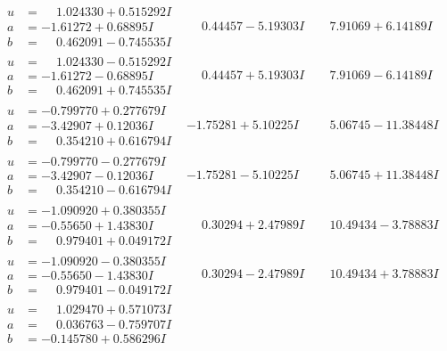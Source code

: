 \documentclass[1p]{elsarticle_modified}
\theoremstyle{definition}
\begin{document}
$$\begin{array}{c|c|c}
\begin{aligned}
u &= \phantom{-}1.024330 + 0.515292 I \\
a &= -1.61272 + 0.68895 I \\
b &= \phantom{-}0.462091 - 0.745535 I\end{aligned}
 & \phantom{-}0.44457 - 5.19303 I & \phantom{-}7.91069 + 6.14189 I \\ \hline\begin{aligned}
u &= \phantom{-}1.024330 - 0.515292 I \\
a &= -1.61272 - 0.68895 I \\
b &= \phantom{-}0.462091 + 0.745535 I\end{aligned}
 & \phantom{-}0.44457 + 5.19303 I & \phantom{-}7.91069 - 6.14189 I \\ \hline\begin{aligned}
u &= -0.799770 + 0.277679 I \\
a &= -3.42907 + 0.12036 I \\
b &= \phantom{-}0.354210 + 0.616794 I\end{aligned}
 & -1.75281 + 5.10225 I & \phantom{-}5.06745 - 11.38448 I \\ \hline\begin{aligned}
u &= -0.799770 - 0.277679 I \\
a &= -3.42907 - 0.12036 I \\
b &= \phantom{-}0.354210 - 0.616794 I\end{aligned}
 & -1.75281 - 5.10225 I & \phantom{-}5.06745 + 11.38448 I \\ \hline\begin{aligned}
u &= -1.090920 + 0.380355 I \\
a &= -0.55650 + 1.43830 I \\
b &= \phantom{-}0.979401 + 0.049172 I\end{aligned}
 & \phantom{-}0.30294 + 2.47989 I & \phantom{-}10.49434 - 3.78883 I \\ \hline\begin{aligned}
u &= -1.090920 - 0.380355 I \\
a &= -0.55650 - 1.43830 I \\
b &= \phantom{-}0.979401 - 0.049172 I\end{aligned}
 & \phantom{-}0.30294 - 2.47989 I & \phantom{-}10.49434 + 3.78883 I \\ \hline\begin{aligned}
u &= \phantom{-}1.029470 + 0.571073 I \\
a &= \phantom{-}0.036763 - 0.759707 I \\
b &= -0.145780 + 0.586296 I\end{aligned}

\end{array}$$
\end{document}
